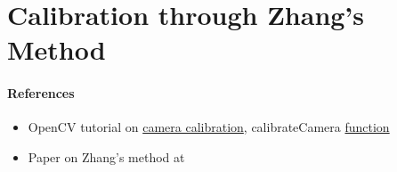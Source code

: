 
\section[Zhang's Method]{Calibration through Zhang's Method}

\paragraph{References}
\begin{itemize}
    \item OpenCV tutorial on \href{https://docs.opencv.org/4.x/dc/dbb/tutorial_py_calibration.html}{camera calibration}, calibrateCamera \href{https://docs.opencv.org/4.x/d9/d0c/group__calib3d.html#ga3207604e4b1a1758aa66acb6ed5aa65d}{function}
    \item Paper on Zhang's method at \cite{zhang2000flexible}
\end{itemize}
